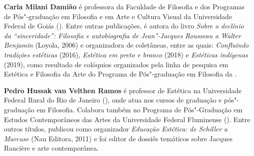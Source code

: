 
\textbf{Carla Milani Damião} é professora da Faculdade de Filosofia e dos Programas de Pós"-graduação em Filosofia e em Arte e Cultura Visual da Universidade Federal de Goiás ().
Entre outras publicações, é autora do livro \emph{Sobre o declínio da ``sinceridade'': Filosofia e
autobiografia de Jean"-Jacques Rousseau a Walter Benjamin} (Loyola, 2006) e organizadora de
coletâneas, entre as quais: \emph{Confluindo tradições estéticas} (2016), \emph{Estética em preto e branco} (2018) e \emph{Estéticas indígenas} (2019), como resultado de colóquios organizados pela linha de pesquisa em Estética e Filosofia da Arte do Programa de Pós"-graduação em Filosofia da .

\textbf{Pedro Hussak van Velthen Ramos} é professor de Estética na Universidade Federal Rural do
Rio de Janeiro (), onde atua nos cursos de graduação e pós"-graduação em Filosofia.
Colabora também no Programa de Pós"-Graduação em Estudos Contemporâneos das Artes da
Universidade Federal Fluminense (). Entre outros títulos, publicou como organizador \emph{Educação Estética: de Schiller a Marcuse} (Nau Editora, 2011) e foi editor de dossiês temáticos sobre Jacques Rancière e arte contemporânea.

